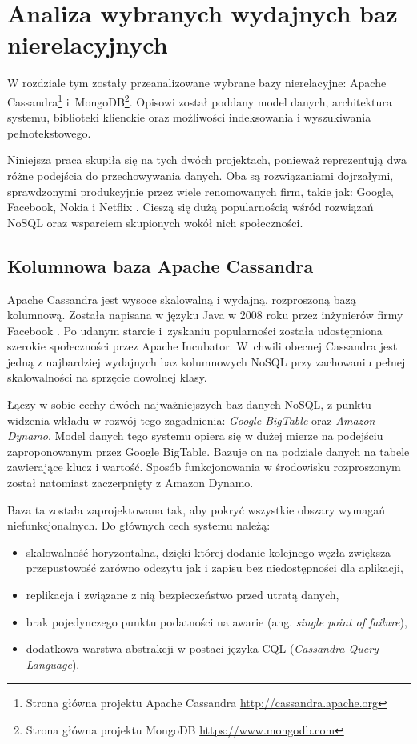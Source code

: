 \chapter{Analiza wybranych wydajnych baz nierelacyjnych}

W rozdziale tym zostały przeanalizowane wybrane bazy nierelacyjne: Apache Cassandra\footnote{Strona główna projektu Apache Cassandra \url{http://cassandra.apache.org}} i~MongoDB\footnote{Strona główna projektu MongoDB \url{https://www.mongodb.com}}.
Opisowi został poddany model danych, architektura systemu, biblioteki klienckie oraz możliwości indeksowania i wyszukiwania pełnotekstowego. 

Niniejsza praca skupiła się na tych dwóch projektach, ponieważ reprezentują dwa różne podejścia do przechowywania danych. 
Oba są rozwiązaniami dojrzałymi, sprawdzonymi produkcyjnie przez wiele renomowanych firm, takie jak: Google, Facebook, Nokia i Netflix \cite{MongoCustomers}\cite{CassandraNetflix}.
Cieszą się dużą popularnością wśród rozwiązań NoSQL oraz wsparciem skupionych wokół nich społeczności.

\section{Kolumnowa baza Apache Cassandra}

Apache Cassandra jest wysoce skalowalną i wydajną, rozproszoną bazą kolumnową.
Została napisana w języku Java w 2008 roku przez inżynierów firmy Facebook \cite{CassandraOrigins}.
Po udanym starcie i~zyskaniu popularności została udostępniona szerokie społeczności przez Apache Incubator.
W~chwili obecnej Cassandra jest jedną z najbardziej wydajnych baz kolumnowych NoSQL przy zachowaniu pełnej skalowalności na sprzęcie dowolnej klasy.

Łączy w sobie cechy dwóch najważniejszych baz danych NoSQL, z punktu widzenia wkładu w rozwój tego zagadnienia: \textit{Google BigTable} oraz \textit{Amazon Dynamo}.
Model danych tego systemu opiera się w dużej mierze na podejściu zaproponowanym przez Google BigTable.
Bazuje on na podziale danych na tabele zawierające klucz i wartość.
Sposób funkcjonowania w środowisku rozproszonym został natomiast zaczerpnięty z Amazon Dynamo.

Baza ta została zaprojektowana tak, aby pokryć wszystkie obszary wymagań niefunkcjonalnych.
Do głównych cech systemu należą:
\begin{itemize}
    \item skalowalność horyzontalna, dzięki której dodanie kolejnego węzła zwiększa przepustowość zarówno odczytu jak i zapisu bez niedostępności dla aplikacji,
    \item replikacja i związane z nią bezpieczeństwo przed utratą danych,
    \item brak pojedynczego punktu podatności na awarie (ang. \textit{single point of failure}),
    \item dodatkowa warstwa abstrakcji w postaci języka CQL (\textit{Cassandra Query Language}).
\end{itemize}

